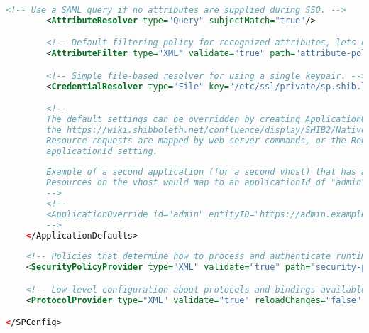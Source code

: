 \begin{lstlisting}[language=xml]
        <!-- Use a SAML query if no attributes are supplied during SSO. -->
        <AttributeResolver type="Query" subjectMatch="true"/>

        <!-- Default filtering policy for recognized attributes, lets other data pass. -->
        <AttributeFilter type="XML" validate="true" path="attribute-policy.xml"/>

        <!-- Simple file-based resolver for using a single keypair. -->
        <CredentialResolver type="File" key="/etc/ssl/private/sp.shib.lan_key.pem" certificate="/etc/ssl/certs/sp.shib.lan_cert.pem"/>

        <!--
        The default settings can be overridden by creating ApplicationOverride elements (see
        the https://wiki.shibboleth.net/confluence/display/SHIB2/NativeSPApplicationOverride topic).
        Resource requests are mapped by web server commands, or the RequestMapper, to an
        applicationId setting.
        
        Example of a second application (for a second vhost) that has a different entityID.
        Resources on the vhost would map to an applicationId of "admin":
        -->
        <!--
        <ApplicationOverride id="admin" entityID="https://admin.example.org/shibboleth"/>
        -->
    </ApplicationDefaults>
    
    <!-- Policies that determine how to process and authenticate runtime messages. -->
    <SecurityPolicyProvider type="XML" validate="true" path="security-policy.xml"/>

    <!-- Low-level configuration about protocols and bindings available for use. -->
    <ProtocolProvider type="XML" validate="true" reloadChanges="false" path="protocols.xml"/>

</SPConfig>
\end{lstlisting}

